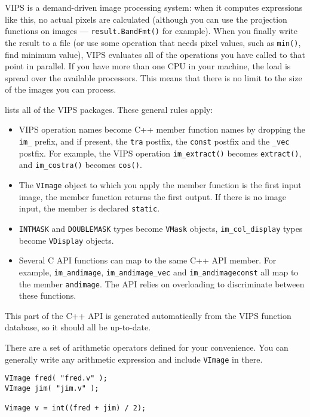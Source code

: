 VIPS is a demand-driven image processing system: when it computes expressions
like this, no actual pixels are calculated (although you can use the
projection functions on images --- \verb+result.BandFmt()+ for example).  When
you finally write the result to a file (or use some operation that needs pixel
values, such as \verb+min()+, find minimum value), VIPS evaluates all of the
operations you have called to that point in parallel. If you have more than one
CPU in your machine, the load is spread over the available processors. This
means that there is no limit to the size of the images you can process.

 lists all of the VIPS packages. These general
rules apply:

\begin{itemize}

\item
VIPS operation names become C++ member function names by dropping the
\verb+im_+ prefix, and if present, the \verb+tra+ postfix, the \verb+const+
postfix and the \verb+_vec+ postfix. For example, the
VIPS operation \verb+im_extract()+ becomes \verb+extract()+, and
\verb+im_costra()+ becomes \verb+cos()+.

\item
The \verb+VImage+ object to which you apply the member function is the first
input image, the member function returns the first output. If there is no
image input, the member is declared \verb+static+.

\item
\verb+INTMASK+ and \verb+DOUBLEMASK+ types become \verb+VMask+ objects,
\verb+im_col_display+ types become \verb+VDisplay+ objects.

\item
Several C API functions can map to the same C++ API member. For example,
\verb+im_andimage+, \verb+im_andimage_vec+ and \verb+im_andimageconst+ all map
to the member \verb+andimage+. The API relies on overloading to
discriminate between these functions.

\end{itemize}

This part of the C++ API is generated automatically from the VIPS function
database, so it should all be up-to-date.

There are a set of arithmetic operators defined for your convenience. You can
generally write any arithmetic expression and include \verb+VImage+ in there.

\begin{verbatim}
VImage fred( "fred.v" );
VImage jim( "jim.v" );

Vimage v = int((fred + jim) / 2);
\end{verbatim}

